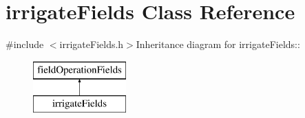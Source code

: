 \hypertarget{classirrigate_fields}{
\section{irrigateFields Class Reference}
\label{classirrigate_fields}
}


{\ttfamily \#include $<$irrigateFields.h$>$}Inheritance diagram for irrigateFields::\begin{figure}[H]
\begin{center}
\leavevmode
\includegraphics[height=2cm]{classirrigate_fields}
\end{center}
\end{figure}
